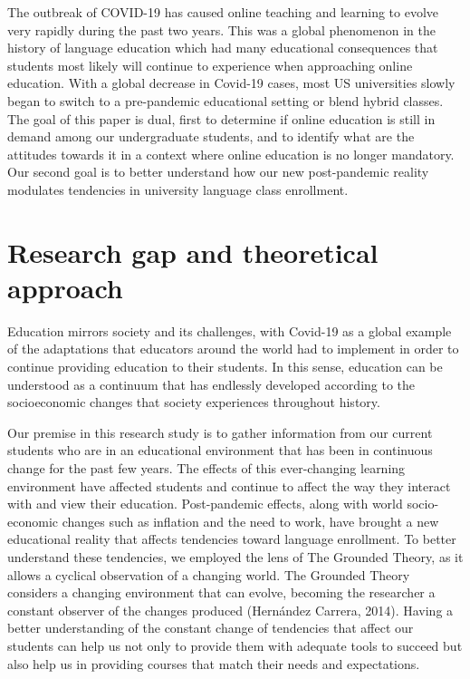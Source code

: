 \documentclass[
  man]{apa6}
\begin{document}
The outbreak of COVID-19 has caused online teaching and learning to evolve very rapidly during the past two years. This was a global phenomenon in the history of language education which had many educational consequences that students most likely will continue to experience when approaching online education. With a global decrease in Covid-19 cases, most US universities slowly began to switch to a pre-pandemic educational setting or blend hybrid classes. The goal of this paper is dual, first to determine if online education is still in demand among our undergraduate students, and to identify what are the attitudes towards it in a context where online education is no longer mandatory. Our second goal is to better understand how our new post-pandemic reality modulates tendencies in university language class enrollment.

\hypertarget{research-gap-and-theoretical-approach}{%
\section{Research gap and theoretical approach}\label{research-gap-and-theoretical-approach}}

Education mirrors society and its challenges, with Covid-19 as a global example of the adaptations that educators around the world had to implement in order to continue providing education to their students. In this sense, education can be understood as a continuum that has endlessly developed according to the socioeconomic changes that society experiences throughout history.

Our premise in this research study is to gather information from our current students who are in an educational environment that has been in continuous change for the past few years. The effects of this ever-changing learning environment have affected students and continue to affect the way they interact with and view their education. Post-pandemic effects, along with world socio-economic changes such as inflation and the need to work, have brought a new educational reality that affects tendencies toward language enrollment. To better understand these tendencies, we employed the lens of The Grounded Theory, as it allows a cyclical observation of a changing world. The Grounded Theory considers a changing environment that can evolve, becoming the researcher a constant observer of the changes produced (Hernández Carrera, 2014). Having a better understanding of the constant change of tendencies that affect our students can help us not only to provide them with adequate tools to succeed but also help us in providing courses that match their needs and expectations.
\end{document}
